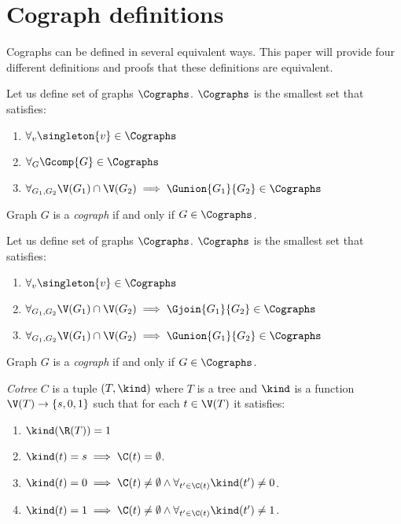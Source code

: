 
\section{Cograph definitions}

Cographs can be defined in several equivalent ways. This paper will provide four different definitions and proofs that these definitions are equivalent.

\begin{defi}\label{codef1}
    Let us define set of graphs $\Cographs$. $\Cographs$ is the smallest set that satisfies:
    \begin{enumerate}
        \item $\forall_v \singleton{v} \in \Cographs$
        \item $\forall_G \Gcomp{G} \in \Cographs$
        \item $\forall_{G_1, G_2} \V(G_1) \cap \V(G_2) \implies \Gunion{G_1}{G_2} \in \Cographs$
    \end{enumerate}
    Graph $G$ is a \emph{cograph} if and only if $G \in \Cographs$.
\end{defi}
\begin{defi}\label{codef2}
    Let us define set of graphs $\Cographs$. $\Cographs$ is the smallest set that satisfies:
    \begin{enumerate}
        \item $\forall_v \singleton{v} \in \Cographs$
        \item $\forall_{G_1, G_2} \V(G_1) \cap \V(G_2) \implies \Gjoin{G_1}{G_2} \in \Cographs$
        \item $\forall_{G_1, G_2} \V(G_1) \cap \V(G_2) \implies \Gunion{G_1}{G_2} \in \Cographs$
    \end{enumerate}
    Graph $G$ is a \emph{cograph} if and only if $G \in \Cographs$.
\end{defi}

\begin{defi}
    \emph{Cotree} $C$ is a tuple $(T, \kind)$ where $T$ is a tree and $\kind$ is a function $\V(T) \to \{s,0,1\}$ such that for each $t \in \V(T)$ it satisfies:
    \begin{enumerate}
        \item $\kind(\R(T)) = 1$
        \item $\kind(t) = s \implies \C(t) = \emptyset$.
        \item $\kind(t) = 0 \implies \C(t) \neq \emptyset \land \forall_{t' \in \C(t)} \kind(t') \neq 0$.
        \item $\kind(t) = 1 \implies \C(t) \neq \emptyset \land \forall_{t' \in \C(t)} \kind(t') \neq 1$.
    \end{enumerate}
\end{defi}

